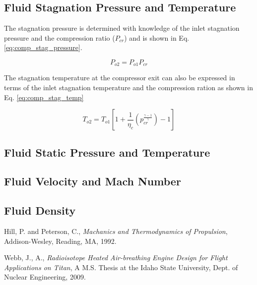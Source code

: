 \subsection{Fluid Stagnation Pressure and Temperature}
The stagnation pressure is determined with knowledge of the inlet stagnation pressure and the compression ratio ($P_{cr}$) and is
shown in Eq. \ref{eq:comp_stag_pressure}.

\begin{equation}
\label{eq:comp_stag_pressure}
P_{o2} = P_{o1}P_{cr}
\end{equation}

The stagnation temperature at the compressor exit can also be expressed in terms of the inlet stagnation temperature and the 
compression ration as shown in Eq. \ref{eq:comp_stag_temp}

\begin{equation}
\label{eq:comp_stag_temp}
T_{o2}=T_{o1}\left[1 + \frac{1}{\eta_c}\left(p_{cr}^{\frac{\gamma-1}{\gamma}}\right)-1\right]
\end{equation}

\subsection{Fluid Static Pressure and Temperature}

\subsection{Fluid Velocity and Mach Number}

\subsection{Fluid Density}


\begin{thebibliography}{2}

 Hill, P. and Peterson, C., \emph{Machanics and Thermodynamics of Propulsion}, Addison-Wesley, Reading, MA, 1992.

 Webb, J., A., \emph{Radioisotope Heated Air-breathing Engine Design for Flight Applications on Titan}, A M.S. Thesis at
                         the Idaho State University, Dept. of Nuclear Engineering, 2009.
\end{thebibliography}
